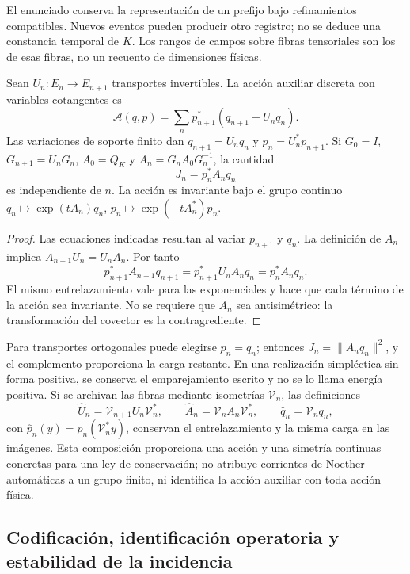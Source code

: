 El enunciado conserva la representación de un prefijo bajo refinamientos
compatibles. Nuevos eventos pueden producir otro registro; no se deduce
una constancia temporal de \(K\). Los rangos de campos sobre fibras
tensoriales son los de esas fibras, no un recuento de dimensiones físicas.

\begin{proposition}
\label{lib01:carga-noether}
Sean \(U_n:E_n\to E_{n+1}\) transportes invertibles. La acción
auxiliar discreta con variables cotangentes es
\[
 \mathcal A(q,p)=\sum_n p_{n+1}^*(q_{n+1}-U_nq_n).
\]
Las variaciones de soporte finito dan
\(q_{n+1}=U_nq_n\) y \(p_n=U_n^*p_{n+1}\). Si
\(G_0=I\), \(G_{n+1}=U_nG_n\), \(A_0=Q_K\) y
\(A_n=G_nA_0G_n^{-1}\), la cantidad
\[
 J_n=p_n^*A_nq_n
\]
es independiente de \(n\). La acción es invariante bajo el grupo
continuo
\(q_n\mapsto\exp(tA_n)q_n\),
\(p_n\mapsto\exp(-tA_n^*)p_n\).
\end{proposition}
\begin{proof}
Las ecuaciones indicadas resultan al variar \(p_{n+1}\) y \(q_n\).
La definición de \(A_n\) implica
\(A_{n+1}U_n=U_nA_n\). Por tanto
\[
 p_{n+1}^*A_{n+1}q_{n+1}
 =p_{n+1}^*U_nA_nq_n=p_n^*A_nq_n.
\]
El mismo entrelazamiento vale para las exponenciales y hace que cada
término de la acción sea invariante. No se requiere que \(A_n\)
sea antisimétrico: la transformación del covector es la contragrediente.
\end{proof}

Para transportes ortogonales puede elegirse \(p_n=q_n\); entonces
\(J_n=\|A_nq_n\|^2\), y el complemento proporciona la carga
restante. En una realización simpléctica sin forma positiva, se conserva
el emparejamiento escrito y no se lo llama energía positiva. Si se
archivan las fibras mediante isometrías \(\mathcal V_n\), las
definiciones
\[
 \widehat U_n=\mathcal V_{n+1}U_n\mathcal V_n^*,\qquad
 \widehat A_n=\mathcal V_nA_n\mathcal V_n^*,\qquad
 \widehat q_n=\mathcal V_nq_n,
\]
con \(\widehat p_n(y)=p_n(\mathcal V_n^*y)\), conservan el
entrelazamiento y la misma carga en las imágenes. Esta composición
proporciona una acción y una simetría continuas concretas para una ley de
conservación; no atribuye corrientes de Noether automáticas a un grupo
finito, ni identifica la acción auxiliar con toda acción física.

\subsection{Codificación, identificación operatoria y estabilidad de la incidencia}
\label{lib01:alcance}

